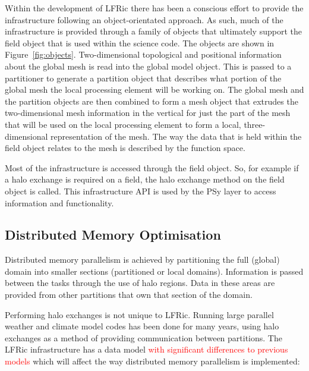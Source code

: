 \documentclass[review,times]{elsarticle}
\begin{document}
Within the development of LFRic there has been a conscious effort to
provide the infrastructure following an object-orientated approach. As
such, much of the infrastructure is provided through a family of
objects that ultimately support the field object that is used within the
science code. The objects are shown in
Figure~\ref{fig:objects}. Two-dimensional topological and positional
information about the global mesh is read into the global model object.
This is passed to a partitioner to generate a partition object that
describes what portion of the global mesh the local processing element
will be working on. The global mesh and the partition objects are then
combined to form a mesh object that extrudes the two-dimensional mesh
information in the vertical for just the part of the mesh that will be
used on the local processing element to form a local, three-dimensional
representation of the mesh. The way the data that is held within the
field object relates to the mesh is described by the function space.

Most of the infrastructure is accessed through the field object. So, for
example if a halo exchange is required on a field, the halo exchange
method on the field object is called. This infrastructure
API is used by the PSy layer to access information and functionality.

\subsection{\label{sec:sub:distmem}Distributed Memory Optimisation}

Distributed memory parallelism is achieved by partitioning the full
(global) domain into smaller sections (partitioned or local domains).
Information is passed between the tasks through the use of halo regions.
Data in these areas are provided from other partitions that own that
section of the domain.

Performing halo exchanges is not unique to LFRic. Running large parallel
weather and climate model codes has been done for many years, using
halo exchanges as a
method of providing communication between partitions. The LFRic
infrastructure has a data model \textcolor{red}{with significant differences to previous
models} which will affect the way distributed memory parallelism is
implemented:
\end{document}
